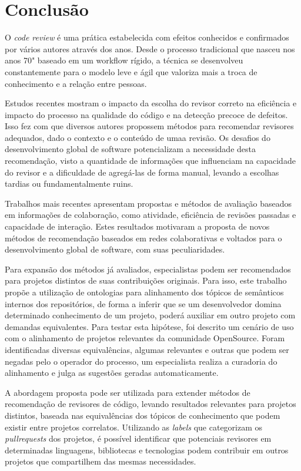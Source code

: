 \documentclass[sigconf]{acmart}
\begin{document}
\section{Conclusão}\label{cha:conclusao}

O \textit{code review} é uma prática estabelecida com efeitos conhecidos e confirmados por vários autores através dos anos. Desde o processo tradicional que nasceu nos anos 70" baseado em um workflow rígido, a técnica se desenvolveu constantemente para o modelo leve e ágil que valoriza mais a troca de conhecimento e a relação entre pessoas.

Estudos recentes mostram o impacto da escolha do revisor correto na eficiência e impacto do processo na qualidade do código e na detecção precoce de defeitos. Isso fez com que diversos autores propossem métodos para recomendar revisores adequados, dado o contexto e o conteúdo de umaa revisão. Os desafios do desenvolvimento global de software potencializam a necessidade desta recomendação, visto a quantidade de informações que influenciam na capacidade do revisor e a dificuldade de agregá-las de forma manual, levando a escolhas tardias ou fundamentalmente ruins.

Trabalhos mais recentes apresentam propostas e métodos de avaliação baseados em informações de colaboração, como atividade, eficiência de revisões passadas e capacidade de interação. Estes resultados motivaram a proposta de novos métodos de recomendação baseados em redes colaborativas e voltados para o desenvolvimento global de software, com suas peculiaridades.

Para expansão dos métodos já avaliados, especialistas podem ser recomendados para projetos distintos de suas contribuições originais. Para isso, este trabalho propõe a utilização de ontologias para alinhamento dos tópicos de semânticos internos dos repositórios, de forma a inferir que se um desenvolvedor domina determinado conhecimento de um projeto, poderá auxiliar em outro projeto com demandas equivalentes. Para testar esta hipótese, foi descrito um cenário de uso com o alinhamento de projetos relevantes da comunidade OpenSource. Foram identificadas diversas equivalências, algumas relevantes e outras que podem ser negadas pelo o operador do processo, um especialista realiza a curadoria do alinhamento e julga as sugestões geradas automaticamente.

A abordagem proposta pode ser utilizada para extender métodos de recomendação de revisores de código, levando resultados relevantes para projetos distintos, baseada nas equivalências dos tópicos de conhecimento que podem existir entre projetos correlatos. Utilizando as \textit{labels} que categorizam os \textit{pullrequests} dos projetos, é possível identificar que potenciais revisores em determinadas linguagens, bibliotecas e tecnologias podem contribuir em outros projetos que compartilhem das mesmas necessidades.
\end{document}
